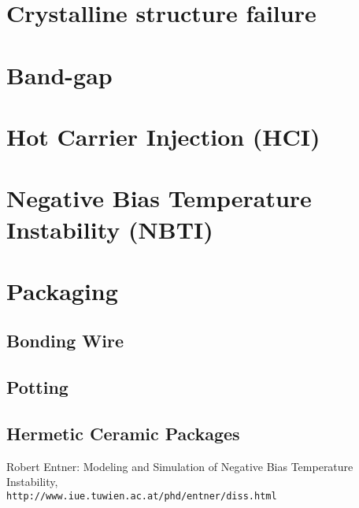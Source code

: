 \documentclass{article}
\begin{document}
\section{Crystalline structure failure}

\section{Band-gap}

\section{Hot Carrier Injection (HCI)}

\section{Negative Bias Temperature Instability (NBTI)}

\section{Packaging}
\subsection{Bonding Wire}
\subsection{Potting}
\subsection{Hermetic Ceramic Packages}


\begin{thebibliography}{1}
Robert Entner: Modeling and Simulation of 
Negative Bias Temperature Instability,
\\\texttt{http://www.iue.tuwien.ac.at/phd/entner/diss.html}
\end{thebibliography}
\end{document}
